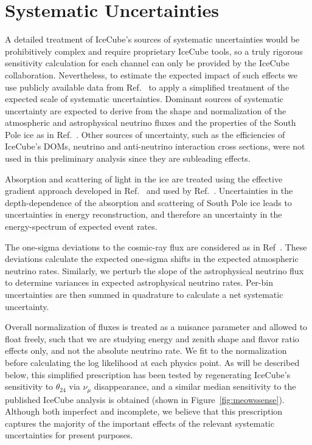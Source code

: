 \documentclass[main.tex]{subfiles}
\begin{document}
\section{\label{sec:syst} Systematic Uncertainties}

A detailed treatment of IceCube's sources of systematic uncertainties would be prohibitively complex and require proprietary IceCube tools, so a truly rigorous sensitivity calculation for each channel can only be provided by the IceCube collaboration. Nevertheless, to estimate the expected impact of such effects we use publicly available data from Ref.~\cite{Aartsen_2020_prd} to apply a simplified treatment of the expected scale of systematic uncertainties. 
Dominant sources of systematic uncertainty are expected to derive from the shape and normalization of the atmospheric and astrophysical neutrino fluxes and the properties of the South Pole ice as in Ref.~\cite{Aartsen_2020_prd}. Other sources of uncertainty, such as the efficiencies of IceCube's DOMs, neutrino and anti-neutrino interaction cross sections, were not used in this preliminary analysis since they are subleading effects.

Absorption and scattering of light in the ice are treated using the effective gradient approach developed in Ref.~\cite{Aartsen_2019_snow} and used by Ref.~\cite{Aartsen_2020}. 
Uncertainties in the depth-dependence of the absorption and scattering of South Pole ice leads to uncertainties in energy reconstruction, and therefore an uncertainty in the energy-spectrum of expected event rates. 

The one-sigma deviations to the cosmic-ray flux are considered as in Ref~\cite{Aartsen_2020_prd}. 
These deviations calculate the expected one-sigma shifts in the expected atmospheric neutrino rates. 
Similarly, we perturb the slope of the astrophysical neutrino flux to determine variances in expected astrophysical neutrino rates. Per-bin uncertainties are then summed in quadrature to calculate a net systematic uncertainty.

Overall normalization of fluxes is treated as a nuisance parameter and allowed to float freely, such that we are studying energy and zenith shape and flavor ratio effects only, and not the absolute neutrino rate. We fit to the normalization before calculating the log likelihood at each physics point.  As will be described below, this simplified prescription has been tested by regenerating IceCube's sensitivity to $\theta_{24}$ via $\nu_\mu$ disappearance, and a similar median sensitivity to the published IceCube analysis is obtained (shown in Figure~\ref{fig:meowssense}).  Although both imperfect and incomplete, we believe that this prescription captures the majority of the important effects of the relevant systematic uncertainties for present purposes.
\end{document}
